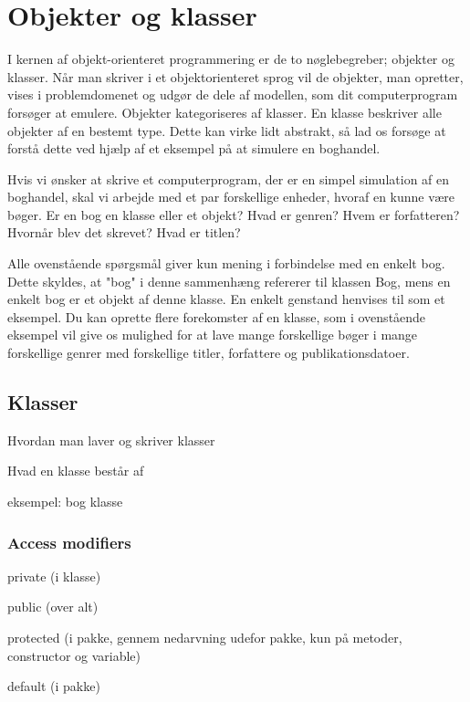 \chapter{Objekter og klasser}

I kernen af objekt-orienteret programmering er de to nøglebegreber; objekter og klasser. Når man skriver i et objektorienteret sprog vil de objekter, man opretter, vises i problemdomenet og udgør de dele af modellen, som dit computerprogram forsøger at emulere. Objekter kategoriseres af klasser. En klasse beskriver alle objekter af en bestemt type. Dette kan virke lidt abstrakt, så lad os forsøge at forstå dette ved hjælp af et eksempel på at simulere en boghandel.

\begin{example}
	Hvis vi ønsker at skrive et computerprogram, der er en simpel simulation af en boghandel, skal vi arbejde med et par forskellige enheder, hvoraf en kunne være bøger. Er en bog en klasse eller et objekt? Hvad er genren? Hvem er forfatteren? Hvornår blev det skrevet? Hvad er titlen?
	
	Alle ovenstående spørgsmål giver kun mening i forbindelse med en enkelt bog. Dette skyldes, at "bog" i denne sammenhæng refererer til klassen Bog, mens en enkelt bog er et objekt af denne klasse. En enkelt genstand henvises til som et eksempel. Du kan oprette flere forekomster af en klasse, som i ovenstående eksempel vil give os mulighed for at lave mange forskellige bøger i mange forskellige genrer med forskellige titler, forfattere og publikationsdatoer.
\end{example}

\section{Klasser}

Hvordan man laver og skriver klasser

Hvad en klasse består af

eksempel: bog klasse

\subsection{Access modifiers}

private (i klasse)

public (over alt)

protected (i pakke, gennem nedarvning udefor pakke, kun på metoder, constructor og variable)

default (i pakke)

